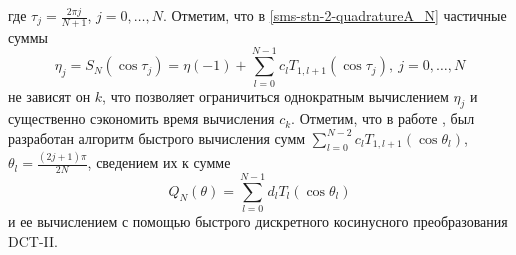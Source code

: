 где $\tau_j=\frac{2\pi j}{N+1}$, $j=0,\ldots,N$. Отметим, что в \eqref{sms-stn-2-quadratureA_N} частичные суммы
\begin{equation}\label{sms-stn-2-PartialSolSum}
\eta_j=S_N(\cos\tau_j)=\eta(-1)+\sum\limits_{l=0}^{N-1}c_l T_{1,l+1}(\cos\tau_j),\ j=0,\ldots,N
\end{equation}
не зависят он $k$, что позволяет ограничиться однократным вычислением $\eta_j$ и существенно сэкономить время вычисления $c_k$. Отметим, что в работе \cite{sms-stn-2-demiSMS_ShTN}, был разработан алгоритм быстрого вычисления сумм $\sum_{l=0}^{N-2}c_l T_{1,l+1}(\cos\theta_l)$, $\theta_l=\frac{(2j+1)\pi}{2N}$, сведением их к сумме
\begin{equation}\label{sms-stn-2-DCT-II}
Q_N(\theta)=\sum_{l=0}^{N-1}d_l T_{l}(\cos\theta_l)
\end{equation}
и ее вычислением с помощью быстрого дискретного косинусного преобразования DCT-II.

